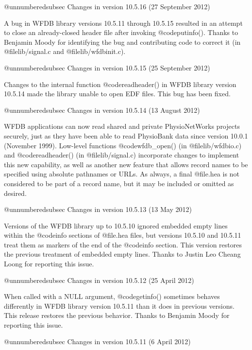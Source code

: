 {{{{{{{{@unnumberedsubsec Changes in version 10.5.16 (27 September 2012)

A bug in WFDB library versions 10.5.11 through 10.5.15 resulted in an attempt
to close an already-closed header file after invoking @code{putinfo()}.  Thanks
to Benjamin Moody for identifying the bug and contributing code to correct it
(in @file{lib/signal.c} and @file{lib/wfdbinit.c}).

@unnumberedsubsec Changes in version 10.5.15 (25 September 2012)

Changes to the internal function @code{readheader()} in WFDB library version
10.5.14 made the library unable to open EDF files.  This bug has been
fixed.

@unnumberedsubsec Changes in version 10.5.14 (13 August 2012)

WFDB applications can now read shared and private PhysioNetWorks projects
securely, just as they have been able to read PhysioBank data since version
10.0.1 (November 1999).  Low-level functions @code{wfdb_open()} (in
@file{lib/wfdbio.c}) and @code{readheader()} (in @file{lib/signal.c})
incorporate changes to implement this new capability, as well as another new
feature that allows record names to be specified using absolute pathnames or
URLs.  As always, a final @file{.hea} is not considered to be part of a record
name, but it may be included or omitted as desired.

@unnumberedsubsec Changes in version 10.5.13 (13 May 2012)

Versions of the WFDB library up to 10.5.10 ignored embedded empty lines
within the @code{info} sections of @file{.hea} files, but versions 10.5.10 and
10.5.11 treat them as markers of the end of the @code{info} section.  This
version restores the previous treatment of embedded empty lines.  Thanks
to Justin Leo Cheang Loong for reporting this issue.

@unnumberedsubsec Changes in version 10.5.12 (25 April 2012)

When called with a NULL argument, @code{getinfo()} sometimes behaves
differently in WFDB library version 10.5.11 than it does in previous versions.
This release restores the previous behavior.  Thanks to Benjamin Moody for
reporting this issue.

@unnumberedsubsec Changes in version 10.5.11 (6 April 2012)

}}}}}}}}
